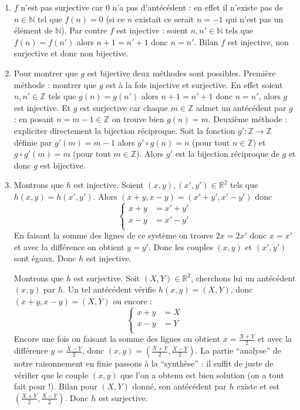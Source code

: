 \documentclass[11pt,a4paper]{article}
\newcommand{\Nn}{\mathbb{N}} \newcommand{\N}{\mathbb{N}}
\newcommand{\Zz}{\mathbb{Z}} \newcommand{\Z}{\mathbb{Z}}
\newcommand{\Rr}{\mathbb{R}} \newcommand{\R}{\mathbb{R}}
\begin{document}
\begin{enumerate}
\item $f$ n'est pas surjective car $0$ n'a pas d'antécédent : en effet il n'existe pas de $n\in\Nn$ tel que $f(n)=0$ (si ce $n$ existait ce serait $n=-1$
qui n'est pas un élément de $\Nn$). Par contre $f$ est injective : soient $n,n' \in \Nn$ tels que $f(n)=f(n')$ alors
$n+1=n'+1$ donc $n=n'$. Bilan $f$ est injective, non surjective et donc non bijective.

\item Pour montrer que $g$ est bijective deux méthodes sont possibles. Première méthode : montrer que $g$ est à la fois injective et surjective.
En effet soient $n,n'\in \Zz$ tels que $g(n)=g(n')$ alors $n+1=n'+1$ donc $n=n'$, alors $g$ est injective. Et $g$ est surjective car chaque $m\in \Zz$
admet un antécédent par $g$ : en posant $n=m-1 \in \Zz$ on trouve bien $g(n)=m$.
Deuxième méthode : expliciter directement la bijection réciproque. Soit la fonction $g' : \Zz \to \Zz$ définie par $g'(m)=m-1$
alors $g' \circ g(n) = n$ (pour tout $n\in \Zz$) et $g \circ g'(m) = m$ (pour tout $m\in \Zz$). Alors $g'$ est la bijection réciproque de $g$
et donc $g$ est bijective.

\item Montrons que $h$ est injective. Soient $(x,y), (x',y') \in \Rr^2$ tels que $h(x,y)=h(x',y')$.
Alors $(x + y, x-y)=(x' + y', x'-y')$ donc 
$$\begin{cases}
    x+y &= x'+y'\\
    x-y &= x'-y'\\
  \end{cases}$$
En faisant la somme des lignes de ce système on trouve $2x=2x'$ donc $x=x'$ et avec la différence on obtient $y=y'$.
Donc les couples $(x,y)$ et $(x',y')$ sont égaux. Donc $h$ est injective.

Montrons que $h$ est surjective. Soit $(X,Y) \in \Rr^2$, cherchons lui un antécédent $(x,y)$ par $h$.
Un tel antécédent vérifie $h(x,y)=(X,Y)$, donc $(x+y,x-y)=(X,Y)$ ou encore :
$$\begin{cases}
    x+y &= X\\
    x-y &= Y\\
  \end{cases}$$
Encore une fois on faisant la somme des lignes on obtient $x=\frac{X+Y}{2}$ et avec la différence $y = \frac{X-Y}{2}$,
donc $(x,y) = (\frac{X+Y}{2},\frac{X-Y}{2})$. La partie ``analyse'' de notre raisonnement en finie passons à la ``synthèse'' :
il suffit de juste de vérifier que le couple $(x,y)$ que l'on a obtenu est bien solution (on a tout fait pour !).
Bilan pour $(X,Y)$ donné, son antécédent par $h$ existe et est $(\frac{X+Y}{2},\frac{X-Y}{2})$. Donc $h$ est surjective.


\end{enumerate}
\end{document}
